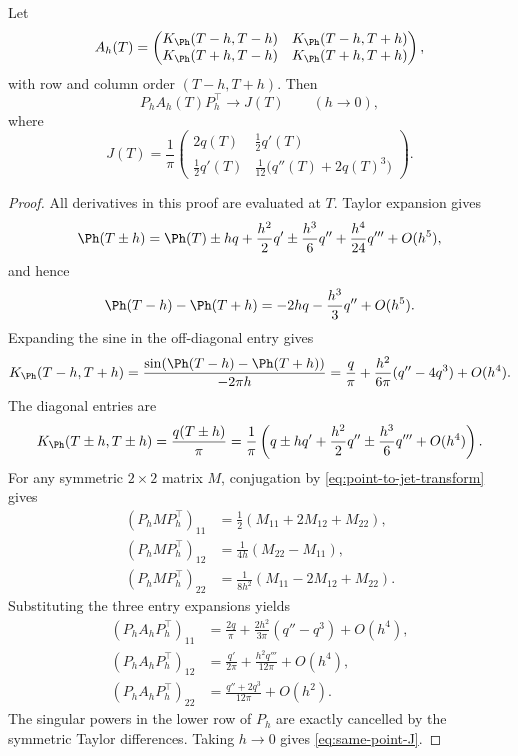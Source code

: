 \begin{lemma}
\label{lem:same-point-jet-limit}
Let
\[
A_h(T)=
\begin{pmatrix}
K_\Ph(T-h,T-h) & K_\Ph(T-h,T+h)\\
K_\Ph(T+h,T-h) & K_\Ph(T+h,T+h)
\end{pmatrix},
\]
with row and column order \((T-h,T+h)\).  Then
\[
P_h A_h(T)P_h^\top \longrightarrow J(T)
\qquad (h\to0),
\]
where
\begin{equation}
\label{eq:same-point-J}
J(T)=\frac1\pi
\begin{pmatrix}
2q(T) & \tfrac12 q'(T)\\[1ex]
\tfrac12 q'(T) & \tfrac1{12}\bigl(q''(T)+2q(T)^3\bigr)
\end{pmatrix}.
\end{equation}
\end{lemma}

\begin{proof}
All derivatives in this proof are evaluated at \(T\).  Taylor expansion gives
\[
\Ph(T\pm h)=\Ph(T)\pm hq+\frac{h^2}{2}q'
\pm\frac{h^3}{6}q''+\frac{h^4}{24}q'''+O(h^5),
\]
and hence
\begin{equation}
\label{eq:phi-diff-same-point}
\Ph(T-h)-\Ph(T+h)=-2hq-\frac{h^3}{3}q''+O(h^5).
\end{equation}
Expanding the sine in the off-diagonal entry gives
\begin{equation}
\label{eq:A12-same-point-expansion}
K_\Ph(T-h,T+h)
=\frac{\sin(\Ph(T-h)-\Ph(T+h))}{-2\pi h}
=\frac{q}{\pi}+\frac{h^2}{6\pi}(q''-4q^3)+O(h^4).
\end{equation}
The diagonal entries are
\[
K_\Ph(T\pm h,T\pm h)
=\frac{q(T\pm h)}{\pi}
=\frac1\pi\left(q\pm hq'+\frac{h^2}{2}q''
\pm\frac{h^3}{6}q'''+O(h^4)\right).
\]
For any symmetric \(2\times2\) matrix \(M\), conjugation by
\eqref{eq:point-to-jet-transform} gives
\begin{align*}
(P_hMP_h^\top)_{11}
&=\frac12(M_{11}+2M_{12}+M_{22}),\\
(P_hMP_h^\top)_{12}
&=\frac1{4h}(M_{22}-M_{11}),\\
(P_hMP_h^\top)_{22}
&=\frac1{8h^2}(M_{11}-2M_{12}+M_{22}).
\end{align*}
Substituting the three entry expansions yields
\begin{align*}
(P_hA_hP_h^\top)_{11}
&=\frac{2q}{\pi}+\frac{2h^2}{3\pi}(q''-q^3)+O(h^4),\\
(P_hA_hP_h^\top)_{12}
&=\frac{q'}{2\pi}+\frac{h^2q'''}{12\pi}+O(h^4),\\
(P_hA_hP_h^\top)_{22}
&=\frac{q''+2q^3}{12\pi}+O(h^2).
\end{align*}
The singular powers in the lower row of \(P_h\) are exactly cancelled by the
symmetric Taylor differences.  Taking \(h\to0\) gives
\eqref{eq:same-point-J}.
\end{proof}

